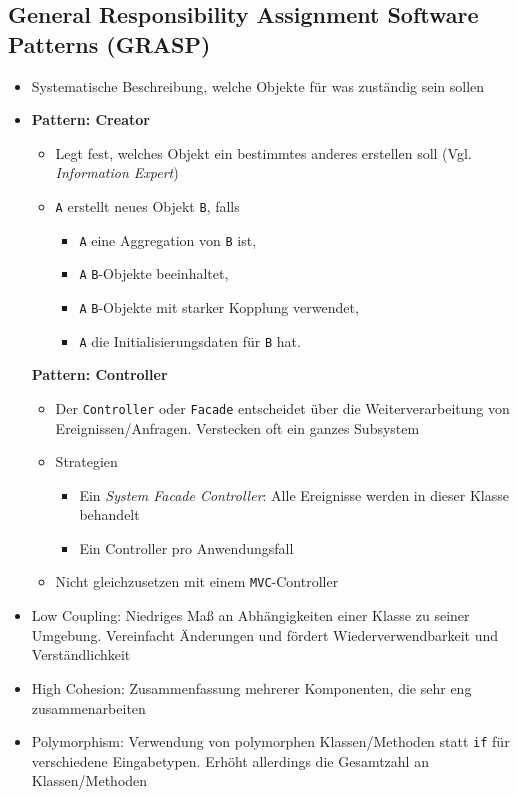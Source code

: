 \subsection{General Responsibility Assignment Software Patterns (GRASP)}
\begin{itemize}
	\item Systematische Beschreibung, welche Objekte für was zuständig sein sollen
	\item \textbf{Pattern: Creator}
	\begin{itemize}
		\item Legt fest, welches Objekt ein bestimmtes anderes erstellen soll (Vgl. \textit{Information Expert})
		\item \texttt{A} erstellt neues Objekt \texttt{B}, falls
		\begin{itemize}
			\item \texttt{A} eine Aggregation von \texttt{B} ist,
			\item \texttt{A} \texttt{B}-Objekte beeinhaltet,
			\item \texttt{A} \texttt{B}-Objekte mit starker Kopplung verwendet,
			\item \texttt{A} die Initialisierungsdaten für \texttt{B} hat.
		\end{itemize}
	\end{itemize}
	\textbf{Pattern: Controller}
	\begin{itemize}
		\item Der \texttt{Controller} oder \texttt{Facade} entscheidet über die Weiterverarbeitung von Ereignissen/Anfragen. Verstecken oft ein ganzes Subsystem
		\item Strategien
		\begin{itemize}
			\item Ein \textit{System Facade Controller}: Alle Ereignisse werden in dieser Klasse behandelt
			\item Ein Controller pro Anwendungsfall
		\end{itemize}
		\item Nicht gleichzusetzen mit einem \texttt{MVC}-Controller
	\end{itemize}
	\item Low Coupling: Niedriges Maß an Abhängigkeiten einer Klasse zu seiner Umgebung. Vereinfacht Änderungen und fördert Wiederverwendbarkeit und Verständlichkeit
	\item High Cohesion: Zusammenfassung mehrerer Komponenten, die sehr eng zusammenarbeiten
	\item Polymorphism: Verwendung von polymorphen Klassen/Methoden statt \texttt{if} für verschiedene Eingabetypen. Erhöht allerdings die Gesamtzahl an Klassen/Methoden

\end{itemize}
